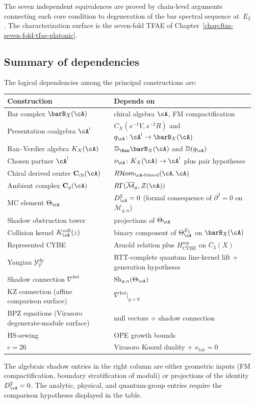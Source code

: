 The seven independent equivalences are proved by chain-level
arguments connecting each core condition to degeneration of the bar
spectral sequence at~$E_2$.
The characterization surface is the seven-fold TFAE of
Chapter~\ref{chap:ftm-seven-fold-tfae-platonic}.

\subsection{Summary of dependencies}
\label{subsec:thqg-intro-guide-dependencies}

The logical dependencies among the principal constructions are:
\begin{center}
\small
\begin{tabular}{ll}
\textbf{Construction} & \textbf{Depends on} \\ \hline
Bar complex $\barB_X(\cA)$ & chiral algebra $\cA$, FM compactification \\[2pt]
Presentation coalgebra $\cA^{\mathrm i}$
 & $C_X(s^{-1}V,s^{-2}R)$ and
 $q_\cA\colon\cA^{\mathrm i}\to\barB_X(\cA)$ \\[2pt]
Ran--Verdier algebra $K_X(\cA)$
 & $\mathbb D_{\Ran}\barB_X(\cA)$ and $\mathbb D(q_\cA)$ \\[2pt]
Chosen partner $\cA^!$
 & $\nu_\cA\colon K_X(\cA)\to\cA^!$ plus pair hypotheses \\[2pt]
Chiral derived centre $\mathbf{C}_{\mathrm{ch}}(\cA)$ &
$R\mathcal{H}om_{\cA\text{-bimod}}(\cA,\cA)$ \\[2pt]
Ambient complex $\mathbf{C}_g(\cA)$ &
$R\Gamma(\overline{\mathcal{M}}_g,\mathcal{Z}(\cA))$ \\[2pt]
MC element $\Theta_\cA$ & $D_\cA^2 = 0$ (formal consequence of $\partial^2 = 0$ on $\overline{\mathcal{M}}_{g,n}$) \\[2pt]
Shadow obstruction tower & projections of $\Theta_\cA$ \\[2pt]
Collision kernel $K_\cA^{\mathrm{coll}}(z)$ & binary component of
$\Theta_\cA^{E_1}$ on $\barB_X(\cA)$ \\[2pt]
Represented CYBE & Arnold relation plus $H_{\mathrm{CYBE}}^{\mathrm{rep}}$
on $\overline{C}_3(X)$ \\[2pt]
Yangian $\mathcal{Y}^{\mathrm{dg}}_T$ &
RTT-complete quantum line-kernel lift + generation hypotheses \\[2pt]
Shadow connection $\nabla^{\mathrm{hol}}$ & $\operatorname{Sh}_{g,n}(\Theta_\cA)$ \\[2pt]
 KZ connection (affine comparison surface) &
 $\nabla^{\mathrm{hol}}|_{g=0}$ \\[2pt]
 BPZ equations (Virasoro degenerate-module surface) &
 null vectors + shadow connection \\[2pt]
HS-sewing & OPE growth bounds \\[2pt]
$c = 26$ & Virasoro Koszul duality + $\kappa_{\mathrm{tot}} = 0$
\end{tabular}
\end{center}
The algebraic shadow entries in the right column are either geometric
inputs (FM compactification, boundary stratification of moduli) or
projections of the identity $D_\cA^2 = 0$. The analytic, physical, and
quantum-group entries require the comparison hypotheses displayed in
the table.

